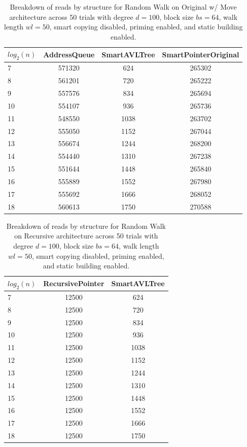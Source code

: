 \begin{table}[]
\centering
\begin{tabular}{|l|c|c|c|}
$log_2(n)$ & AddressQueue & SmartAVLTree & SmartPointerOriginal \\ \hline
7 & 571320 & 624 & 265302 \\ \hline
8 & 561201 & 720 & 265222 \\ \hline
9 & 557576 & 834 & 265694 \\ \hline
10 & 554107 & 936 & 265736 \\ \hline
11 & 548550 & 1038 & 263702 \\ \hline
12 & 555050 & 1152 & 267044 \\ \hline
13 & 556674 & 1244 & 268200 \\ \hline
14 & 554440 & 1310 & 267238 \\ \hline
15 & 551644 & 1448 & 265840 \\ \hline
16 & 555889 & 1552 & 267980 \\ \hline
17 & 555692 & 1666 & 268052 \\ \hline
18 & 560613 & 1750 & 270588 \\ \hline
\end{tabular}
\caption{Breakdown of reads by structure for Random Walk on Original w/ Move architecture across 50 trials with degree $d=100$, block size $bs=64$, walk length $wl=50$, smart copying disabled, priming enabled, and static building enabled.}
    \label{tab:reads_by_structure_rw_d100_bs64_trials50_copiesfalse_primetrue_staticinsertiontrue_wl50_ptoriginal_movetrue}
\end{table}

\begin{table}[]
\centering
\begin{tabular}{|l|c|c|}
$log_2(n)$ & RecursivePointer & SmartAVLTree \\ \hline
7 & 12500 & 624 \\ \hline
8 & 12500 & 720 \\ \hline
9 & 12500 & 834 \\ \hline
10 & 12500 & 936 \\ \hline
11 & 12500 & 1038 \\ \hline
12 & 12500 & 1152 \\ \hline
13 & 12500 & 1244 \\ \hline
14 & 12500 & 1310 \\ \hline
15 & 12500 & 1448 \\ \hline
16 & 12500 & 1552 \\ \hline
17 & 12500 & 1666 \\ \hline
18 & 12500 & 1750 \\ \hline
\end{tabular}
\caption{Breakdown of reads by structure for Random Walk on Recursive architecture across 50 trials with degree $d=100$, block size $bs=64$, walk length $wl=50$, smart copying disabled, priming enabled, and static building enabled.}
    \label{tab:reads_by_structure_rw_d100_bs64_trials50_copiesfalse_primetrue_staticinsertiontrue_wl50_ptrecursive_movetrue}
\end{table}

